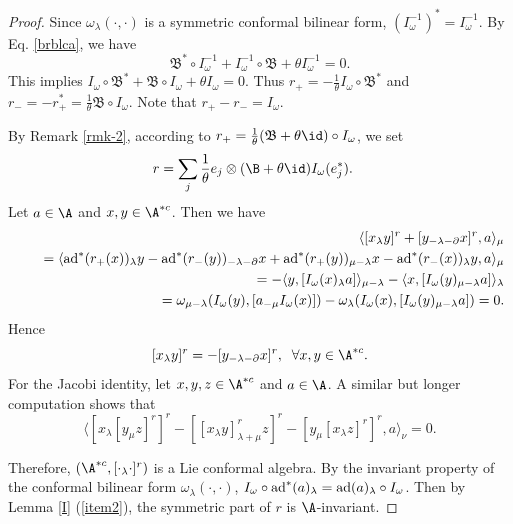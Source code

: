 \documentclass[12pt]{amsart}
\begin{document}
\begin{proof}
Since $\omega_\lambda(\cdot,\cdot)$ is a symmetric conformal bilinear form,
$(I^{-1}_\omega )^*=I^{-1}_\omega$. By Eq. \eqref{brblca}, we have
$$\mathfrak{B}^*\circ I^{-1}_\omega+I^{-1}_\omega\circ
\mathfrak{B}+\theta I^{-1}_\omega=0. $$ This implies $I_\omega \circ
\mathfrak{B}^*+\mathfrak{B}\circ I_\omega+\theta I_\omega=0$. Thus
$r_+=-\frac{1}{\theta}I_\omega\circ \mathfrak{B}^*$ and
$r_-=-r^*_+=\frac{1}{\theta}\mathfrak{B}\circ I_\omega$. Note that
$r_+-r_-=I_\omega$.

 
By Remark \ref{rmk-2},  according to
$r_+=\frac{1}{\theta}(\mathfrak{B}+\theta \id)\circ I_\omega $, we
set
\begin{align*}
    r&%
    =\sum_j \frac{1}{\theta}e_j\otimes (\B+\theta\id)I_\omega (e_j^*).
\end{align*}
 Let $a\in \A$ and $x,y\in \A^{*c}$. Then we have
\begin{eqnarray*}
    &&\langle [x_\lambda y]^r+[y_{-\lambda-\partial}x]^r,a\rangle_\mu\\
    &&\quad=\langle {\rm ad}^*(r_+(x))_\lambda y-{\rm ad}^*(r_-(y))_{-\lambda-\partial}x+ {\rm ad}^*(r_+(y))_{\mu-\lambda} x-{\rm ad}^*(r_-(x))_{\lambda}y ,a\rangle_\mu\\
    &&\quad=-\langle y,[I_\omega (x)_\lambda a]\rangle_{\mu-\lambda}-\langle x,[I_\omega (y)_{\mu-\lambda}a]\rangle_\lambda\\
    &&\quad=\omega_{\mu-\lambda}(I_\omega (y),[a_{-\mu} I_\omega (x)])-\omega_\lambda(I_\omega (x),[I_\omega
    (y)_{\mu-\lambda}a])=0.
\end{eqnarray*}
Hence $$[x_\lambda y]^r=-[y_{-\lambda-\partial}x]^r,\;\; \forall
x, y\in \A^{*c}.$$
For the Jacobi identity, let $x,y,z\in \A^{*c}$ and $a\in \A$. A similar but longer computation shows
that
$$
\langle  [x_\lambda [y_\mu z]^r]^r-[[x_\lambda y]^r_{\lambda+\mu}z]^r-[y_\mu[x_\lambda z]^r]^r ,a\rangle_\nu=0.
$$
 
Therefore, $
(\A^{*c},[\cdot_\lambda\cdot]^r)$ is a Lie conformal algebra. By
the invariant property of the conformal bilinear form
$\omega_\lambda(\cdot,\cdot)$,  $I_\omega\circ {\rm
ad}^*(a)_\lambda={\rm ad}(a)_\lambda\circ I_\omega$. Then by Lemma
\ref{I} (\ref{item2}), the symmetric part of $r$ is
$\A$-invariant.


\end{proof}
\end{document}
